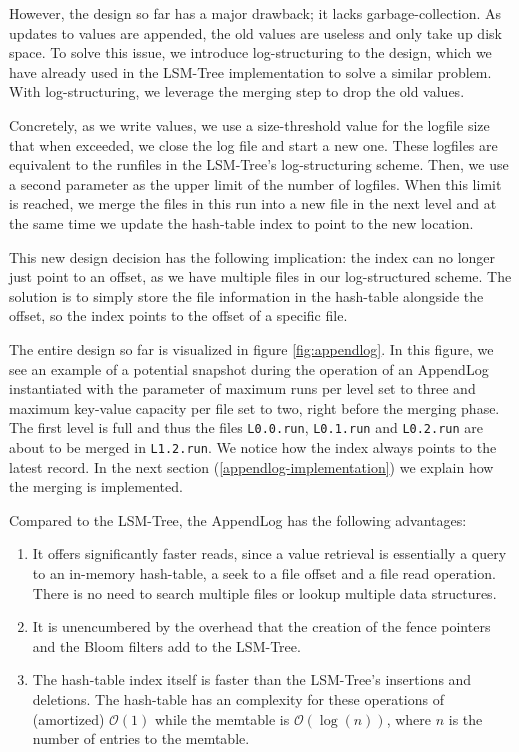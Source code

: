 However, the design so far has a major drawback; it lacks garbage-collection.
As updates to values are appended, the old values are useless and only take up disk space.
To solve this issue, we introduce log-structuring to the design, which we have already used in the LSM-Tree implementation to solve a similar problem.
With log-structuring, we leverage the merging step to drop the old values.

Concretely, as we write values, we use a size-threshold value for the logfile size that when exceeded, we close the log file and start a new one. These logfiles are equivalent to the runfiles in the LSM-Tree's log-structuring scheme.
Then, we use a second parameter as the upper limit of the number of logfiles.
When this limit is reached, we merge the files in this run into a new file in the next level and at the same time we update the hash-table index to point to the new location.

This new design decision has the following implication: the index can no longer just point to an offset, as we have multiple files in our log-structured scheme.
The solution is to simply store the file information in the hash-table alongside the offset, so the index points to the offset of a specific file.

The entire design so far is visualized in figure \ref{fig:appendlog}.
In this figure, we see an example of a potential snapshot during the operation of an AppendLog instantiated with the parameter of maximum runs per level set to three and maximum key-value capacity per file set to two, right before the merging phase. The first level is full and thus the files \verb|L0.0.run|, \verb|L0.1.run| and \verb|L0.2.run| are about to be merged in \verb|L1.2.run|.
We notice how the index always points to the latest record.
In the next section (\ref{appendlog-implementation}) we explain how the merging is implemented.

Compared to the LSM-Tree, the AppendLog has the following advantages:
\begin{enumerate}
    \item It offers significantly faster reads, since a value retrieval is essentially a query to an in-memory hash-table, a seek to a file offset and a file read operation. There is no need to search multiple files or lookup multiple data structures.
    \item It is unencumbered by the overhead that the creation of the fence pointers and the Bloom filters add to the LSM-Tree.
    \item The hash-table index itself is faster than the LSM-Tree's insertions and deletions. The hash-table has an complexity for these operations of (amortized) $\mathcal{O}(1)$ while the memtable is $\mathcal{O}(\log{}(n))$, where $n$ is the number of entries to the memtable.
\end{enumerate}

